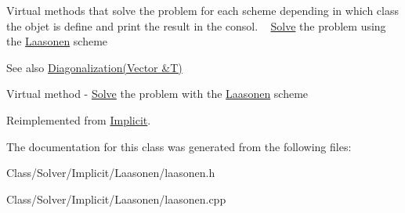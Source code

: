 Virtual methods that solve the problem for each scheme depending in which class the objet is define and print the result in the consol. ~\newline
 \hyperlink{class_solve}{Solve} the problem using the \hyperlink{class_laasonen}{Laasonen} scheme \begin{DoxySeeAlso}{See also}
\hyperlink{class_implicit_a572fff2232977c83c432f993f37a7853}{Diagonalization(\+Vector \&\+T)}
\end{DoxySeeAlso}
Virtual method -\/ \hyperlink{class_solve}{Solve} the problem with the \hyperlink{class_laasonen}{Laasonen} scheme 

Reimplemented from \hyperlink{class_implicit_a027adb4276376991f75fcffbd34740b3}{Implicit}.



The documentation for this class was generated from the following files\+:\begin{DoxyCompactItemize}
\item 
Class/\+Solver/\+Implicit/\+Laasonen/laasonen.\+h\item 
Class/\+Solver/\+Implicit/\+Laasonen/laasonen.\+cpp\end{DoxyCompactItemize}
